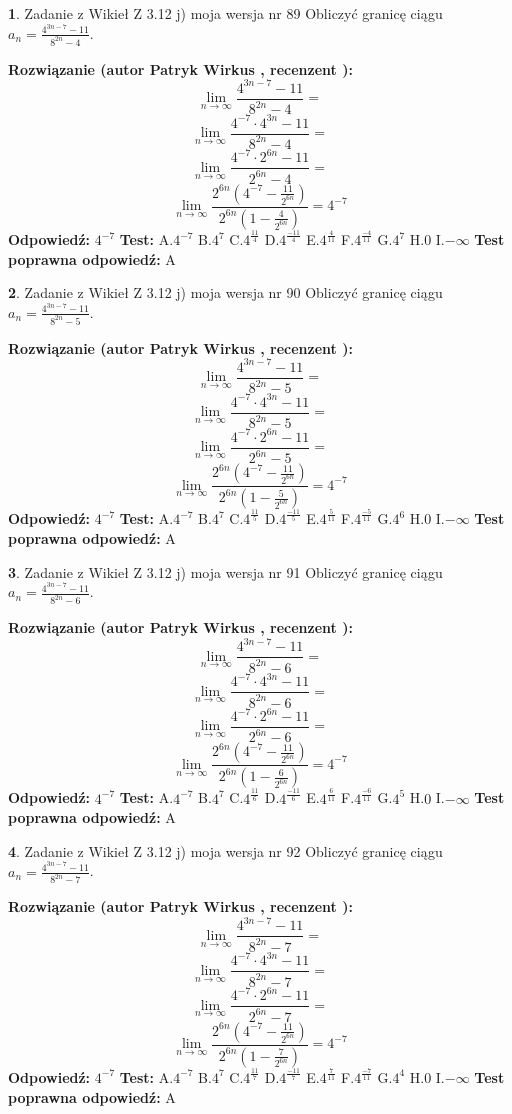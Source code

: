 \documentclass[12pt, a4paper]{article}
\theoremstyle{definition} %
\newtheorem{zad}{}
\newcommand{\zadStart}[1]{\begin{zad}#1\newline}
\newcommand{\zadStop}{\end{zad}}
\newcommand{\rozwStart}[2]{\noindent \textbf{Rozwiązanie (autor #1 , recenzent #2): }\newline}
\newcommand{\rozwStop}{\newline}
\newcommand{\odpStart}{\noindent \textbf{Odpowiedź:}\newline}
\newcommand{\odpStop}{\newline}
\newcommand{\testStart}{\noindent \textbf{Test:}\newline}
\newcommand{\testStop}{\newline}
\newcommand{\kluczStart}{\noindent \textbf{Test poprawna odpowiedź:}\newline}
\newcommand{\kluczStop}{\newline}
\begin{document}
\zadStart{Zadanie z Wikieł Z 3.12 j) moja wersja nr 89}
Obliczyć granicę ciągu $a_{n}=\frac{4^{3n-7}-11}{8^{2n}-4}$.
\zadStop
\rozwStart{Patryk Wirkus}{}
$$\lim\limits_{n\to\infty}\frac{4^{3n-7}-11}{8^{2n}-4}=$$
$$\lim\limits_{n\to\infty}\frac{4^{-7} \cdot 4^{3n}-11}{8^{2n}-4}=$$
$$\lim\limits_{n\to\infty}\frac{4^{-7} \cdot 2^{6n}-11}{2^{6n}-4}=$$
$$\lim\limits_{n\to\infty}\frac{2^{6n}(4^{-7} - \frac{11}{2^{6n}})}{2^{6n}(1-\frac{4}{2^{6n}})}= 4^{-7}$$
\rozwStop
\odpStart
$4^{-7}$
\odpStop
\testStart
A.$4^{-7}$
B.$4^{7}$
C.$4^{\frac{11}{4}}$
D.$4^{\frac{-11}{4}}$
E.$4^{\frac{4}{11}}$
F.$4^{\frac{-4}{11}}$
G.$4^{7}$
H.$0$
I.$-\infty$
\testStop
\kluczStart
A
\kluczStop



\zadStart{Zadanie z Wikieł Z 3.12 j) moja wersja nr 90}
Obliczyć granicę ciągu $a_{n}=\frac{4^{3n-7}-11}{8^{2n}-5}$.
\zadStop
\rozwStart{Patryk Wirkus}{}
$$\lim\limits_{n\to\infty}\frac{4^{3n-7}-11}{8^{2n}-5}=$$
$$\lim\limits_{n\to\infty}\frac{4^{-7} \cdot 4^{3n}-11}{8^{2n}-5}=$$
$$\lim\limits_{n\to\infty}\frac{4^{-7} \cdot 2^{6n}-11}{2^{6n}-5}=$$
$$\lim\limits_{n\to\infty}\frac{2^{6n}(4^{-7} - \frac{11}{2^{6n}})}{2^{6n}(1-\frac{5}{2^{6n}})}= 4^{-7}$$
\rozwStop
\odpStart
$4^{-7}$
\odpStop
\testStart
A.$4^{-7}$
B.$4^{7}$
C.$4^{\frac{11}{5}}$
D.$4^{\frac{-11}{5}}$
E.$4^{\frac{5}{11}}$
F.$4^{\frac{-5}{11}}$
G.$4^{6}$
H.$0$
I.$-\infty$
\testStop
\kluczStart
A
\kluczStop



\zadStart{Zadanie z Wikieł Z 3.12 j) moja wersja nr 91}
Obliczyć granicę ciągu $a_{n}=\frac{4^{3n-7}-11}{8^{2n}-6}$.
\zadStop
\rozwStart{Patryk Wirkus}{}
$$\lim\limits_{n\to\infty}\frac{4^{3n-7}-11}{8^{2n}-6}=$$
$$\lim\limits_{n\to\infty}\frac{4^{-7} \cdot 4^{3n}-11}{8^{2n}-6}=$$
$$\lim\limits_{n\to\infty}\frac{4^{-7} \cdot 2^{6n}-11}{2^{6n}-6}=$$
$$\lim\limits_{n\to\infty}\frac{2^{6n}(4^{-7} - \frac{11}{2^{6n}})}{2^{6n}(1-\frac{6}{2^{6n}})}= 4^{-7}$$
\rozwStop
\odpStart
$4^{-7}$
\odpStop
\testStart
A.$4^{-7}$
B.$4^{7}$
C.$4^{\frac{11}{6}}$
D.$4^{\frac{-11}{6}}$
E.$4^{\frac{6}{11}}$
F.$4^{\frac{-6}{11}}$
G.$4^{5}$
H.$0$
I.$-\infty$
\testStop
\kluczStart
A
\kluczStop



\zadStart{Zadanie z Wikieł Z 3.12 j) moja wersja nr 92}
Obliczyć granicę ciągu $a_{n}=\frac{4^{3n-7}-11}{8^{2n}-7}$.
\zadStop
\rozwStart{Patryk Wirkus}{}
$$\lim\limits_{n\to\infty}\frac{4^{3n-7}-11}{8^{2n}-7}=$$
$$\lim\limits_{n\to\infty}\frac{4^{-7} \cdot 4^{3n}-11}{8^{2n}-7}=$$
$$\lim\limits_{n\to\infty}\frac{4^{-7} \cdot 2^{6n}-11}{2^{6n}-7}=$$
$$\lim\limits_{n\to\infty}\frac{2^{6n}(4^{-7} - \frac{11}{2^{6n}})}{2^{6n}(1-\frac{7}{2^{6n}})}= 4^{-7}$$
\rozwStop
\odpStart
$4^{-7}$
\odpStop
\testStart
A.$4^{-7}$
B.$4^{7}$
C.$4^{\frac{11}{7}}$
D.$4^{\frac{-11}{7}}$
E.$4^{\frac{7}{11}}$
F.$4^{\frac{-7}{11}}$
G.$4^{4}$
H.$0$
I.$-\infty$
\testStop
\kluczStart
A
\kluczStop
\end{document}
